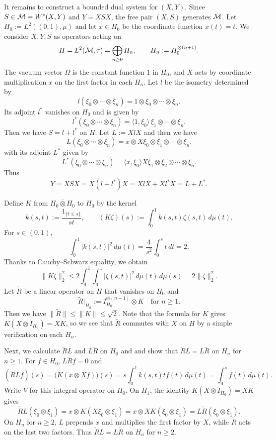 \begin{example}
It remains to construct a bounded dual system for $(X,Y)$.
Since $S\in\mathcal M=W^*(X,Y)$ and $Y=XSX$, the free pair $(X,S)$ generates $\mathcal M$.
Let $H_0:=L^2((0,1),\mu)$ and let $x\in H_0$ be the coordinate function $x(t)=t$.
We consider $X,Y,S$ as operators acting on
\[
 H=L^2(\mathcal M,\tau)=\bigoplus_{n\geq0}H_n,\qquad H_n:=H_0^{\bar\otimes(n+1)}.
\]
The vacuum vector $\Omega$ is the constant function $1$ in $H_0$, and $X$ acts by coordinate multiplication $x$ on the first factor in each $H_n$.
Let $l$ be the isometry determined by
\[
 l(\xi_0\otimes\cdots\otimes\xi_n)
 =1\otimes\xi_0\otimes\cdots\otimes\xi_n.
\]
Its adjoint $l^*$ vanishes on $H_0$ and is given by
\[
 l^*(\xi_0\otimes\cdots\otimes\xi_n)
 =\langle 1,\xi_0\rangle\,\xi_1\otimes\cdots\otimes\xi_n.
\]
Then we have $S=l+l^*$ on $H$.
Let $L:=XlX$ and then we have
\[
 L(\xi_0\otimes\cdots\otimes\xi_n)
 =x\otimes X\xi_0\otimes\xi_1\otimes\cdots\otimes\xi_n.
\]
with its adjoint $L^*$ given by
\[
 L^*(\xi_0\otimes\cdots\otimes\xi_n)
 =\langle x,\xi_0\rangle X\xi_1\otimes\xi_2\otimes\cdots\otimes\xi_n.
\]
Thus
\[
Y=XSX=X(l+l^*)X=XlX+Xl^*X=L+L^*.
\]

Define $K$ from $H_0\bar\otimes H_0$ to $H_0$ by the kernel
\[
 k(s,t):=\frac{1_{\{t\leq s\}}}{st},\qquad
 (K\zeta)(s):=\int_0^1 k(s,t)\zeta(s,t)\,d\mu(t).
\]
For $s\in(0,1)$,
\[
 \int_0^1 |k(s,t)|^2\,d\mu(t)
 =\frac{4}{s^2}\int_0^s t\,dt=2.
\]
Thanks to Cauchy--Schwarz equality, we obtain
\[
 \|K\zeta\|_2^2
 \leq 2\int_0^1\int_0^1|\zeta(s,t)|^2\,d\mu(t)\,d\mu(s)
 =2\|\zeta\|_2^2.
\]
Let $\tilde{R}$ be a linear operator on $H$ that vanishes on $H_0$ and
\[
\tilde{R}|_{H_n}:=I_{H_0}^{\otimes(n-1)}\otimes K\quad\text{for } n\geq1.
\]
Then we have $\|\tilde{R}\|\leq\|K\|\leq\sqrt{2}$.
Note that the formula for $K$ gives $K(X\otimes I_{H_0})=XK$, so we see that $\tilde{R}$ commutes with $X$ on $H$ by a simple verification on each $H_n$.

Next, we calculate $\tilde{R}L$ and $L\tilde{R}$ on $H_0$ and and show that $\tilde{R}L=L\tilde{R}$ on $H_n$ for $n\geq1$.
For $f\in H_0$, $L\tilde{R}f=0$ and
\[
 (\tilde{R}Lf)(s)=\bigl(K(x\otimes Xf)\bigr)(s)
 =s\int_0^1 k(s,t)t f(t)\,d\mu(t)
 =\int_0^s f(t)\,d\mu(t).
\]
Write $V$ for this integral operator on $H_0$.
On $H_1$, the identity $K(X\otimes I_{H_0})=XK$ gives
\[
 \tilde{R}L(\xi_0\otimes\xi_1)
 =x\otimes K(X\xi_0\otimes\xi_1)
 =x\otimes X K(\xi_0\otimes\xi_1)
 =L\tilde{R}(\xi_0\otimes\xi_1).
\]
On $H_n$ for $n\geq2$, $L$ prepends $x$ and multiplies the first factor by $X$, while $\tilde{R}$ acts on the last two factors.
Thus $\tilde{R}L=L\tilde{R}$ on $H_n$ for $n\geq2$.


\end{example}
